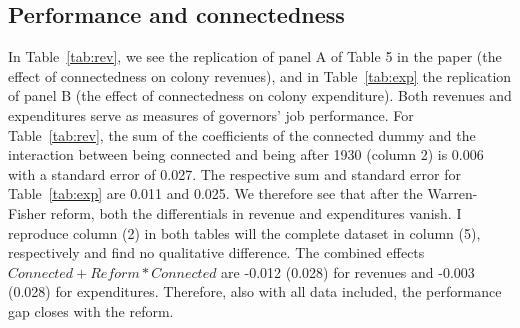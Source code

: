 \documentclass[a4paper]{article}\usepackage[]{graphicx}\usepackage[]{xcolor}
\begin{document}
\subsection{Performance and connectedness}
\hspace*{5mm} In Table~\ref{tab:rev}, we see the replication of panel A of Table 5 in the paper (the effect of connectedness on colony revenues), and in Table~\ref{tab:exp} the replication of panel B (the effect of connectedness on colony expenditure). Both revenues and expenditures serve as measures of governors' job performance. For Table~\ref{tab:rev}, the sum of the coefficients of the connected dummy and the interaction between being connected and being after 1930 (column 2) is 0.006 with a standard error of 0.027. The respective sum and standard error for Table~\ref{tab:exp} are 0.011 and 0.025. We therefore see that after the Warren-Fisher reform, both the differentials in revenue and expenditures vanish. I reproduce column (2) in both tables will the complete dataset in column (5), respectively and find no qualitative difference. The combined effects $Connected + Reform*Connected$ are -0.012 (0.028) for revenues and -0.003 (0.028) for expenditures. Therefore, also with all data included, the performance gap closes with the reform.
\end{document}
